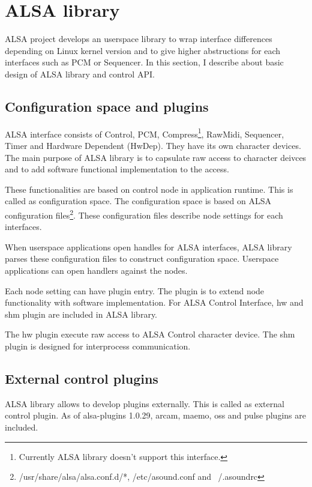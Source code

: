 \documentclass[onecolumn]{article}
\begin{document}
\section{ALSA library}

ALSA project develops an userspace library to wrap interface differences depending on Linux kernel version and to give higher abstructions for each interfaces such as PCM or Sequencer. In this section, I describe about basic design of ALSA library and control API.


\subsection{Configuration space and plugins}

ALSA interface consists of Control, PCM, Compress\footnote{Currently ALSA library doesn't support this interface.}, RawMidi, Sequencer, Timer and Hardware Dependent (HwDep). They have its own character devices. The main purpose of ALSA library is to capsulate raw access to character deivces and to add software functional implementation to the access.

These functionalities are based on control node in application runtime. This is called as configuration space. The configuration space is based on ALSA configuration files\footnote{/usr/share/alsa/alsa.conf.d/*, /etc/asound.conf and ~/.asoundrc}. These configuration files describe node settings for each interfaces.

When userspace applications open handles for ALSA interfaces, ALSA library parses these configuration files to construct configuration space. Userspace applications can open handlers against the nodes.

Each node setting can have plugin entry. The plugin is to extend node functionality with software implementation. For ALSA Control Interface, hw and shm plugin are included in ALSA library.

The hw plugin execute raw access to ALSA Control character device. The shm plugin is designed for interprocess communication.


\subsection{External control plugins}

ALSA library allows to develop plugins externally. This is called as external control plugin. As of alsa-plugins 1.0.29, arcam, maemo, oss and pulse plugins are included.
\end{document}
